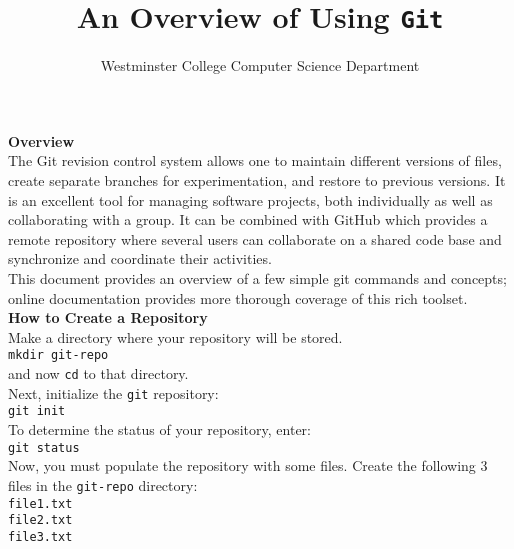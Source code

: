\documentclass[11pt]{article}
\title{An Overview of Using {\tt Git}}
\author{Westminster College Computer Science Department}
\begin{document}
\maketitle

\newpage

\noindent
{\bf Overview} \\

\noindent
The Git revision control system allows one to maintain different versions of files, create separate branches for experimentation, and restore to previous versions. It is an excellent tool for  managing software projects, both individually as well as collaborating with a group. It can be combined with GitHub which provides a remote repository where several users can collaborate on a shared code base and synchronize and coordinate their activities. \\

\noindent
This document provides an overview of a few simple git commands and concepts; online documentation provides more thorough coverage of this rich toolset. \\

\noindent
{\bf How to Create a Repository} \\

\noindent
Make a directory where your repository will be stored. \\

{\tt mkdir git-repo} \\

\noindent
and now {\tt cd} to that directory. \\ 

\noindent
Next, initialize the {\tt git} repository: \\

{\tt git init} \\

\noindent
To determine the status of your repository, enter: \\

{\tt git status} \\

\noindent
Now, you must populate the repository with some files. Create the following 3 files in the {\tt git-repo} directory: \\

{\tt file1.txt} \\ 

{\tt file2.txt} \\ 

{\tt file3.txt} \\ 
\end{document}
